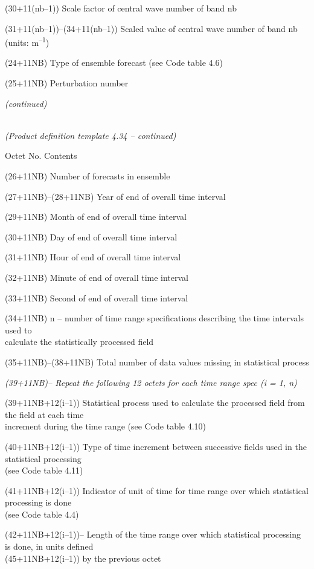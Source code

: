 (30+11(nb--1)) Scale factor of central wave number of band nb

(31+11(nb--1))--(34+11(nb--1)) Scaled value of central wave number of band nb (units: m\textsuperscript{--1})

(24+11NB) Type of ensemble forecast (see Code table 4.6)

(25+11NB) Perturbation number

\emph{(continued)}

\emph{\\
(Product definition template 4.34 -- continued)}

Octet No. Contents

(26+11NB) Number of forecasts in ensemble

(27+11NB)--(28+11NB) Year of end of overall time interval

(29+11NB) Month of end of overall time interval

(30+11NB) Day of end of overall time interval

(31+11NB) Hour of end of overall time interval

(32+11NB) Minute of end of overall time interval

(33+11NB) Second of end of overall time interval

(34+11NB) n -- number of time range specifications describing the time intervals used to\\
calculate the statistically processed field

(35+11NB)--(38+11NB) Total number of data values missing in statistical process

\emph{(39+11NB)-- Repeat the following 12 octets for each time range spec (i = 1, n)}

(39+11NB+12(i--1)) Statistical process used to calculate the processed field from the field at each time\\
increment during the time range (see Code table 4.10)

(40+11NB+12(i--1)) Type of time increment between successive fields used in the statistical processing\\
(see Code table 4.11)

(41+11NB+12(i--1)) Indicator of unit of time for time range over which statistical processing is done\\
(see Code table 4.4)

(42+11NB+12(i--1))-- Length of the time range over which statistical processing is done, in units defined\\
(45+11NB+12(i--1)) by the previous octet

